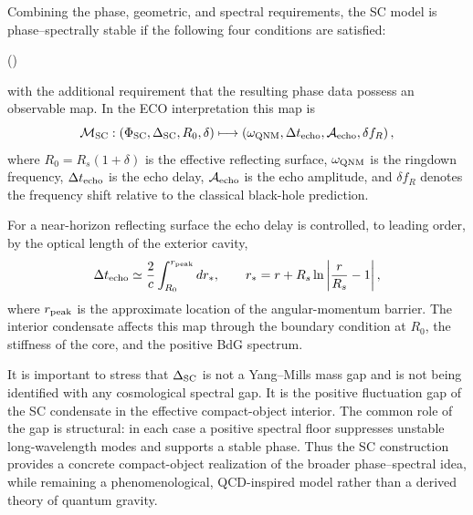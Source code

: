 \documentclass[epj]{svjour}
\begin{document}
Combining the phase, geometric, and spectral requirements, the SC model is
phase--spectrally stable if the following four conditions are satisfied:
\begin{center}
\label{eq:SC_phase_spectral_criterion}
\hfill(\theequation)
\end{center}
with the additional requirement that the resulting phase data possess an
observable map. In the ECO interpretation this map is
\begin{equation}
\mathcal{M}_{\rm SC}:
\left(
\Phi_{\rm SC},
\Delta_{\rm SC},
R_0,
\delta
\right)
\longmapsto
\left(
\omega_{\rm QNM},
\Delta t_{\rm echo},
\mathcal{A}_{\rm echo},
\delta f_R
\right),
\label{eq:SC_observable_map}
\end{equation}
where $R_0=R_s(1+\delta)$ is the effective reflecting surface, $\omega_{\rm QNM}$
is the ringdown frequency, $\Delta t_{\rm echo}$ is the echo delay,
$\mathcal{A}_{\rm echo}$ is the echo amplitude, and $\delta f_R$ denotes the
frequency shift relative to the classical black-hole prediction.

For a near-horizon reflecting surface the echo delay is controlled, to leading
order, by the optical length of the exterior cavity,
\begin{equation}
\Delta t_{\rm echo}
\simeq
\frac{2}{c}
\int_{R_0}^{r_{\rm peak}}
dr_*,
\qquad
r_*
=
r
+
R_s\ln\left|
\frac{r}{R_s}-1
\right| ,
\label{eq:SC_echo_delay_map}
\end{equation}
where $r_{\rm peak}$ is the approximate location of the angular-momentum barrier.
The interior condensate affects this map through the boundary condition at
$R_0$, the stiffness of the core, and the positive BdG spectrum.

It is important to stress that $\Delta_{\rm SC}$ is not a Yang--Mills mass gap
and is not being identified with any cosmological spectral gap. It is the
positive fluctuation gap of the SC condensate in the effective compact-object
interior. The common role of the gap is structural: in each case a positive
spectral floor suppresses unstable long-wavelength modes and supports a stable
phase. Thus the SC construction provides a concrete compact-object realization
of the broader phase--spectral idea, while remaining a phenomenological,
QCD-inspired model rather than a derived theory of quantum gravity.
\end{document}
